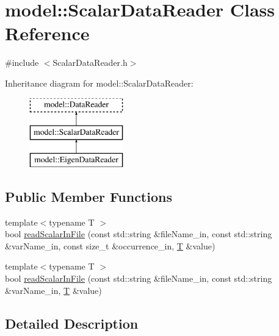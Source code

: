 \hypertarget{classmodel_1_1_scalar_data_reader}{}\section{model\+:\+:Scalar\+Data\+Reader Class Reference}
\label{classmodel_1_1_scalar_data_reader}


{\ttfamily \#include $<$Scalar\+Data\+Reader.\+h$>$}

Inheritance diagram for model\+:\+:Scalar\+Data\+Reader\+:\begin{figure}[H]
\begin{center}
\leavevmode
\includegraphics[height=3.000000cm]{classmodel_1_1_scalar_data_reader}
\end{center}
\end{figure}
\subsection*{Public Member Functions}
\begin{DoxyCompactItemize}
\item 
{\footnotesize template$<$typename T $>$ }\\bool \hyperlink{classmodel_1_1_scalar_data_reader_ab613857e1d52045e15d7e06fde0a0b72}{read\+Scalar\+In\+File} (const std\+::string \&file\+Name\+\_\+in, const std\+::string \&var\+Name\+\_\+in, const size\+\_\+t \&occurrence\+\_\+in, \hyperlink{_spline_node_base__corder1_8h_a82692d3a5502b91460591f1d5504314a}{T} \&value)
\item 
{\footnotesize template$<$typename T $>$ }\\bool \hyperlink{classmodel_1_1_scalar_data_reader_a3f096138fbd78aab571b064027ae6d15}{read\+Scalar\+In\+File} (const std\+::string \&file\+Name\+\_\+in, const std\+::string \&var\+Name\+\_\+in, \hyperlink{_spline_node_base__corder1_8h_a82692d3a5502b91460591f1d5504314a}{T} \&value)
\end{DoxyCompactItemize}


\subsection{Detailed Description}


